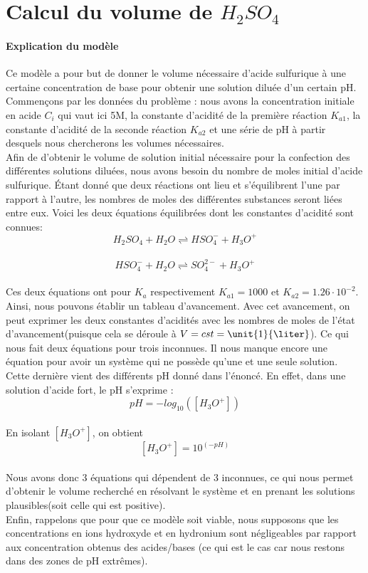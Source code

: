 \documentclass{article}
\begin{document}
\section{Calcul du volume de $H_{2}SO_{4}$}

\paragraph{Explication du modèle}

Ce modèle a pour but de donner le volume nécessaire d'acide sulfurique à une certaine concentration de base pour obtenir une solution diluée d'un certain pH.
\\
Commençons par les données du problème : nous avons la concentration initiale en acide $C_{i}$ qui vaut ici \unit{5}{M}, la constante d'acidité de la première réaction $K_{a1}$, la constante d'acidité de la seconde réaction $K_{a2}$ et une série de pH à partir desquels nous chercherons les volumes nécessaires.
\\
Afin de d'obtenir le volume de solution initial nécessaire pour la confection des différentes solutions diluées, nous avons besoin du nombre de moles initial d'acide sulfurique. Étant donné que deux réactions ont lieu et s'équilibrent l'une par rapport à l'autre, les nombres de moles des différentes substances seront liées entre eux. Voici les deux équations équilibrées dont les constantes d'acidité sont connues:
\\
$$ H_{2}SO_{4} + H_{2}O \rightleftharpoons HSO_{4}^{-} + H_{3}O^{+} $$
\\
$$ HSO_{4}^{-} + H_{2}O \rightleftharpoons SO_{4}^{2-} + H_{3}O^{+} $$
\\
Ces deux équations ont pour $K_{a}$ respectivement $K_{a1} = 1000$ et $K_{a2} = 1.26\cdot 10^{-2}$. Ainsi, nous pouvons établir un tableau d'avancement. Avec cet avancement, on peut exprimer les deux constantes d'acidités avec les nombres de moles de l'état d'avancement(puisque cela se déroule à $V = cst = \unit{1}{\liter}$). Ce qui nous fait deux équations pour trois inconnues. Il nous manque encore une équation pour avoir un système qui ne possède qu'une et une seule solution. Cette dernière vient des différents pH donné dans l'énoncé. En effet, dans une solution d'acide fort, le pH s'exprime :
\\
$$pH = -log_{10}([H_{3}O^{+}])$$
\\
En isolant $[H_{3}O^{+}]$, on obtient
\\
$$[H_{3}O^{+}] = 10^{(-pH)}$$
\\
Nous avons donc $3$ équations qui dépendent de $3$ inconnues, ce qui nous permet d'obtenir le volume recherché en résolvant le système et en prenant les solutions plausibles(soit celle qui est positive).
\\
Enfin, rappelons que pour que ce modèle soit viable, nous supposons que les concentrations en ions hydroxyde et en hydronium sont négligeables par rapport aux concentration obtenus des acides/bases (ce qui est le cas car nous restons dans des zones de pH extrêmes).
\\
\end{document}
